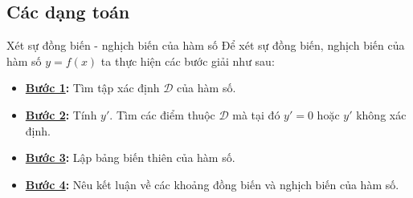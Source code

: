 	\subsection{Các dạng toán}
	
	\begin{dang}{Xét sự đồng biến - nghịch biến của hàm số}
		Để xét sự đồng biến, nghịch biến của hàm số $y=f(x)$ ta thực hiện các bước giải như sau:
		\begin{itemize}
			\item \textbf{\underline{Bước 1}:} Tìm tập xác định $\mathscr{D}$ của hàm số.
			\item \textbf{\underline{Bước 2}:} Tính $y'$. Tìm các điểm thuộc $\mathscr{D}$ mà tại đó $y'=0$ hoặc $y'$ không xác định.
			\item \textbf{\underline{Bước 3}:} Lập bảng biến thiên của hàm số.
			\item \textbf{\underline{Bước 4}:} Nêu kết luận về các khoảng đồng biến và nghịch biến của hàm số.
		\end{itemize}
	\end{dang}
	
